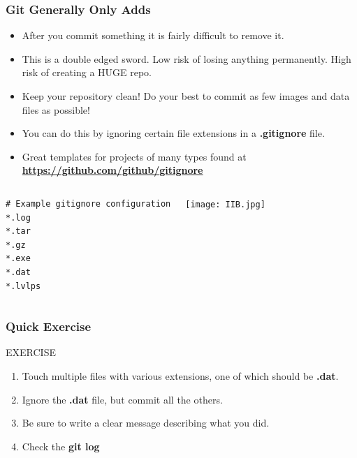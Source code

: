 \documentclass{beamer}
\begin{document}
\begin{frame}[fragile]
\frametitle{Git Generally Only Adds}

\begin{itemize}
\item After you commit something it is fairly difficult to remove it.
\item This is a double edged sword. Low risk of losing anything permanently. High risk of creating a HUGE repo. 
\item Keep your repository clean! Do your best to commit as few images and data files as possible!
\item You can do this by ignoring certain file extensions in a \textbf{.gitignore} file.
\item Great templates for projects of many types found at \textbf{\href{https://github.com/github/}{https://github.com/github/gitignore}}
\end{itemize}
\begin{columns}
\begin{lstlisting}
# Example gitignore configuration
*.log
*.tar
*.gz
*.exe
*.dat
*.lvlps
\end{lstlisting}
\texttt{[image: IIB.jpg]}
\end{columns}
\end{frame}

\begin{frame}[fragile]
\frametitle{Quick Exercise}
    \begin{block}{EXERCISE}
        \begin{enumerate}
        \item Touch multiple files with various extensions, one of which should be \textbf{.dat}.
        \item Ignore the \textbf{.dat} file, but commit all the others.
        \item Be sure to write a clear message describing what you did.
        \item Check the \textbf{git log}
        \end{enumerate}
    \end{block}

\end{frame}
\end{document}
